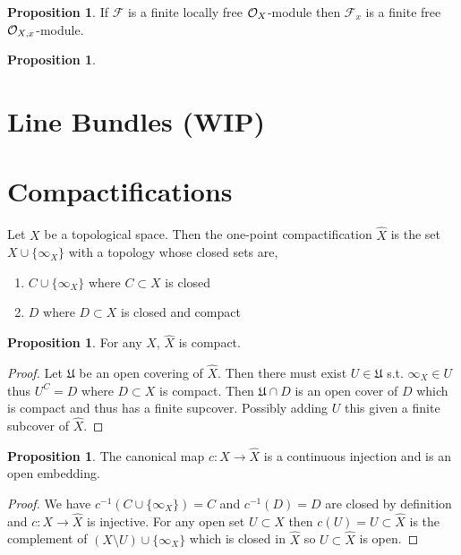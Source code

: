 \documentclass[12pt]{extarticle}
\theoremstyle{definition}
\newtheorem{proposition}[theorem]{Proposition}
\newenvironment{definition}[1][Definition:]{\begin{trivlist}
\item[\hskip \labelsep {\bfseries #1}]}{\end{trivlist}}
\newcommand{\F}{\mathcal{F}}
\begin{document}
\begin{proposition}
If $\F$ is a finite locally free $\mathcal{O}_{X}$-module then $\F_x$ is a finite free $\mathcal{O}_{X, x}$-module.
\end{proposition}

\begin{proposition}

\end{proposition}

\section{Line Bundles (WIP)}


\section{Compactifications}

\begin{definition}
Let $X$ be a topological space. Then the one-point compactification $\hat{X}$ is the set $X \cup \{ \infty_X \}$ with a topology whose closed sets are,
\begin{enumerate}
\item $C \cup \{\infty_X\}$ where $C \subset X$ is closed
\item $D$ where $D \subset X$ is closed and compact
\end{enumerate}
\end{definition}

\begin{proposition}
For any $X$, $\hat{X}$ is compact.
\end{proposition}

\begin{proof}
Let $\mathfrak{U}$ be an open covering of $\hat{X}$. Then there must exist $U \in \mathfrak{U}$ s.t. $\infty_X \in U$ thus $U^C = D$ where $D \subset X$ is compact. Then $\mathfrak{U} \cap D$ is an open cover of $D$ which is compact and thus has a finite supcover. Possibly adding $U$ this given a finite subcover of $\hat{X}$. 
\end{proof}

\begin{proposition}
The canonical map $c : X \to \hat{X}$ is a continuous injection and is an open embedding.
\end{proposition}

\begin{proof}
We have $c^{-1}(C \cup \{ \infty_X \}) = C$ and $c^{-1}(D) = D$ are closed by definition and $c : X \to \hat{X}$ is injective. For any open set $U \subset X$ then $c(U) = U \subset \hat{X}$ is the complement of $(X \setminus U) \cup \{ \infty_X \}$ which is closed in $\hat{X}$ so $U \subset \hat{X}$ is open.  
\end{proof}
\end{document}
